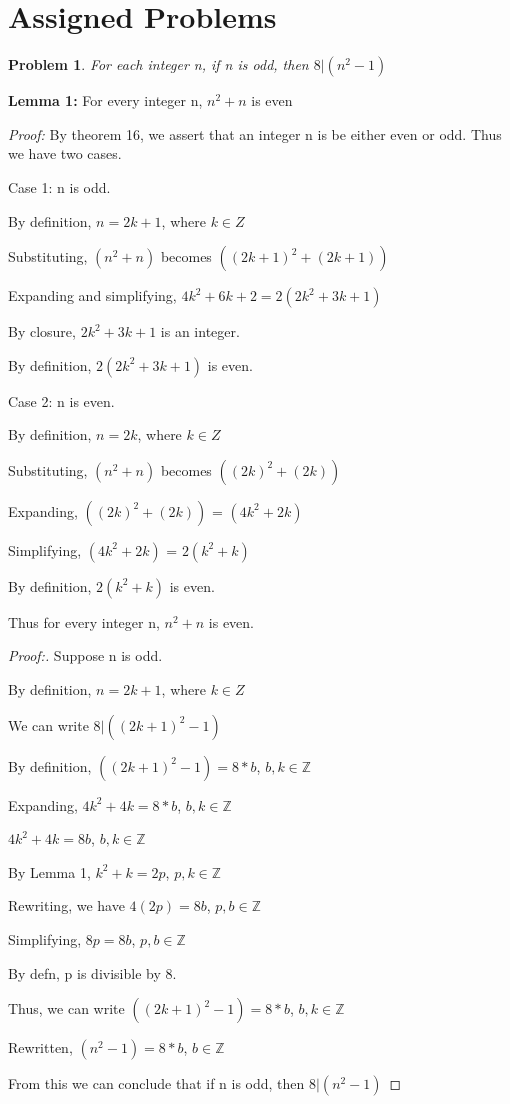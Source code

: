 \documentclass[12pt]{article}
\newtheorem{theorem}{Problem}[section]
\begin{document}
\section{Assigned Problems}


\begin{theorem}
    For each integer n, if n is odd, then $8 | (n^2 - 1)$
\end{theorem}

\textbf{Lemma 1:} For every integer n, $n^2 + n$ is even

\textit{Proof:} By theorem 16, we assert that an integer n is be either even or odd. Thus we have two cases.

\medskip

Case 1: n is odd.

By definition, $n = 2k + 1$, where $k \in Z$

Substituting, $(n^2 + n)$ becomes $((2k + 1)^2 + (2k + 1))$

Expanding and simplifying, $4k^2 + 6k + 2 = 2(2k^2 + 3k + 1)$

By closure, $2k^2 + 3k + 1$ is an integer.

By definition, $2(2k^2 + 3k + 1)$ is even.

\medskip

Case 2: n is even.

By definition, $n = 2k$, where $k \in Z$

Substituting, $(n^2 + n)$ becomes $((2k)^2 + (2k))$

Expanding, $((2k)^2 + (2k))$ = $(4k^2 + 2k)$

Simplifying, $(4k^2 + 2k)$ = $2(k^2 + k)$

By definition, $2(k^2 + k)$ is even.

\medskip

Thus for every integer n, $n^2 + n$ is even.

\begin{proof}[Proof:]
    Suppose n is odd.

    By definition, $n = 2k + 1$, where $k \in Z$

    We can write $8 | ((2k + 1)^2 - 1)$

    By definition, $((2k + 1)^2 - 1) = 8 * b$, $b, k \in \mathbb{Z}$

    Expanding, $4k^2 + 4k = 8 * b$, $b, k \in \mathbb{Z}$

    $4k^2 + 4k = 8b$, $b, k \in \mathbb{Z}$

    By Lemma 1, $k^2 + k = 2p$, $p, k \in \mathbb{Z}$

    Rewriting, we have $4(2p) = 8b$, $p, b \in \mathbb{Z}$

    Simplifying, $8p = 8b$, $p, b \in \mathbb{Z}$

    By defn, p is divisible by 8.

    Thus, we can write $((2k + 1)^2 - 1) = 8 * b$, $b, k \in \mathbb{Z}$

    Rewritten, $(n^2 - 1) = 8 * b$, $b \in \mathbb{Z}$

    From this we can conclude that if n is odd, then $8 | (n^2 - 1)$

\end{proof}
\end{document}
